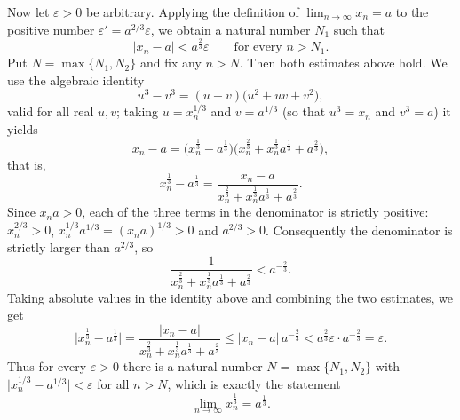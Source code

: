 \documentclass[11pt,a4paper]{article}
\newenvironment{solution}[1]{%
  \par\addvspace{1.7ex}%
  \noindent{\color{solutioncolor}\textbf{#1}}\hspace{0.55em}\ignorespaces}%
  {\par\addvspace{0.9ex}}
\begin{document}
\begin{solution}{Solution 2.1.12}
Now let $\varepsilon>0$ be arbitrary. Applying the definition of $\displaystyle\lim_{n\to\infty}x_{n}=a$ to the positive number $\varepsilon'=a^{2/3}\varepsilon$, we obtain a natural number $N_{1}$ such that
\[
\lvert x_{n}-a\rvert<a^{\frac{2}{3}}\varepsilon\qquad\text{for every }n>N_{1}.
\]
Put $N=\max\{N_{1},N_{2}\}$ and fix any $n>N$. Then both estimates above hold. We use the algebraic identity
\[
u^{3}-v^{3}=(u-v)\bigl(u^{2}+uv+v^{2}\bigr),
\]
valid for all real $u,v$; taking $u=x_{n}^{1/3}$ and $v=a^{1/3}$ (so that $u^{3}=x_{n}$ and $v^{3}=a$) it yields
\[
x_{n}-a=\bigl(x_{n}^{\frac{1}{3}}-a^{\frac{1}{3}}\bigr)\bigl(x_{n}^{\frac{2}{3}}+x_{n}^{\frac{1}{3}}a^{\frac{1}{3}}+a^{\frac{2}{3}}\bigr),
\]
that is,
\[
x_{n}^{\frac{1}{3}}-a^{\frac{1}{3}}
=\frac{x_{n}-a}{x_{n}^{\frac{2}{3}}+x_{n}^{\frac{1}{3}}a^{\frac{1}{3}}+a^{\frac{2}{3}}} .
\]
Since $x_{n}a>0$, each of the three terms in the denominator is strictly positive: $x_{n}^{2/3}>0$, $x_{n}^{1/3}a^{1/3}=(x_{n}a)^{1/3}>0$ and $a^{2/3}>0$. Consequently the denominator is strictly larger than $a^{2/3}$, so
\[
\frac{1}{x_{n}^{\frac{2}{3}}+x_{n}^{\frac{1}{3}}a^{\frac{1}{3}}+a^{\frac{2}{3}}}<a^{-\frac{2}{3}} .
\]
Taking absolute values in the identity above and combining the two estimates, we get
\[
\bigl\lvert x_{n}^{\frac{1}{3}}-a^{\frac{1}{3}}\bigr\rvert
=\frac{\lvert x_{n}-a\rvert}{x_{n}^{\frac{2}{3}}+x_{n}^{\frac{1}{3}}a^{\frac{1}{3}}+a^{\frac{2}{3}}}
\le\lvert x_{n}-a\rvert\,a^{-\frac{2}{3}}
<a^{\frac{2}{3}}\varepsilon\cdot a^{-\frac{2}{3}}=\varepsilon .
\]
Thus for every $\varepsilon>0$ there is a natural number $N=\max\{N_{1},N_{2}\}$ with $\lvert x_{n}^{1/3}-a^{1/3}\rvert<\varepsilon$ for all $n>N$, which is exactly the statement
\[
\lim_{n\to\infty}x_{n}^{\frac{1}{3}}=a^{\frac{1}{3}} .
\]
\end{solution}
\end{document}
